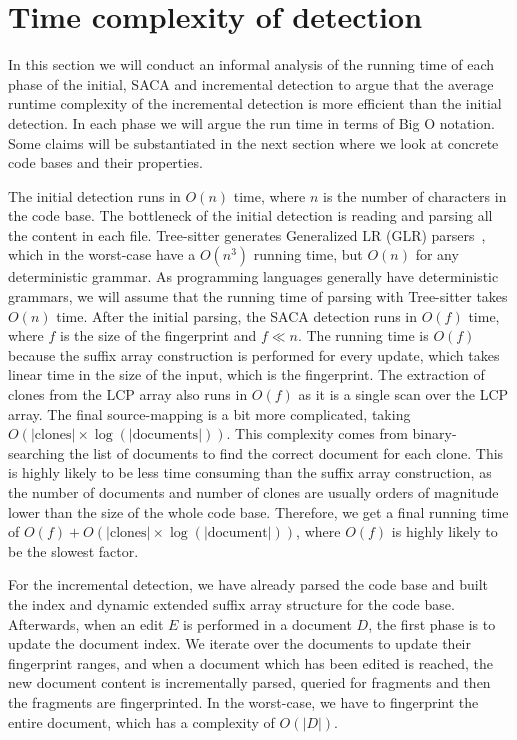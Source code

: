 \section{Time complexity of detection}

In this section we will conduct an informal analysis of the running time of each phase of
the initial, SACA and incremental detection to argue that the average runtime complexity
of the incremental detection is more efficient than the initial detection. In each phase
we will argue the run time in terms of Big O notation. Some claims will be substantiated
in the next section where we look at concrete code bases and their properties.

The initial detection runs in $O(n)$ time, where $n$ is the number of characters in the
code base. The bottleneck of the initial detection is reading and parsing all the content
in each file. Tree-sitter generates Generalized LR (GLR) parsers~\cite{GLR}, which in the
worst-case have a $O(n^3)$ running time, but $O(n)$ for any deterministic grammar. As
programming languages generally have deterministic grammars, we will assume that the
running time of parsing with Tree-sitter takes $O(n)$ time. After the initial parsing, the
SACA detection runs in $O(f)$ time, where $f$ is the size of the fingerprint and $f \ll
n$. The running time is $O(f)$ because the suffix array construction is performed for
every update, which takes linear time in the size of the input, which is the fingerprint.
The extraction of clones from the LCP array also runs in $O(f)$ as it is a single scan
over the LCP array. The final source-mapping is a bit more complicated, taking
$O(\vert\text{clones}\vert \times \log (\vert\text{documents}\vert))$. This complexity
comes from binary-searching the list of documents to find the correct document for each
clone. This is highly likely to be less time consuming than the suffix array construction,
as the number of documents and number of clones are usually orders of magnitude lower than
the size of the whole code base. Therefore, we get a final running time of $O(f) +
O(\vert\text{clones}\vert \times \log(\vert\text{document}\vert))$, where $O(f)$ is highly
likely to be the slowest factor.

For the incremental detection, we have already parsed the code base and built the index
and dynamic extended suffix array structure for the code base. Afterwards, when an edit
$E$ is performed in a document $D$, the first phase is to update the document index. We
iterate over the documents to update their fingerprint ranges, and when a document which
has been edited is reached, the new document content is incrementally parsed, queried
for fragments and then the fragments are fingerprinted. In the worst-case, we have to
fingerprint the entire document, which has a complexity of $O(\vert D\vert)$.


